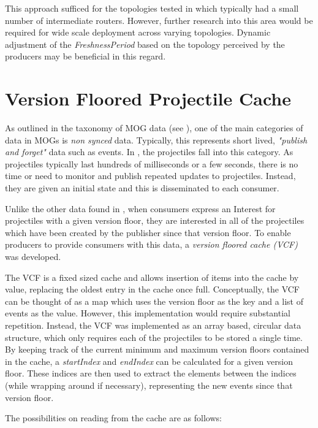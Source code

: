 This approach sufficed for the topologies tested in  which typically had a small number of intermediate routers. However, further research into this area would be required for wide scale deployment across varying topologies. Dynamic adjustment of the \textit{FreshnessPeriod} based on the topology perceived by the producers may be beneficial in this regard.




\section{Version Floored Projectile Cache}
As outlined in the taxonomy of MOG data (see ), one of the main categories of data in MOGs is \textit{non synced} data. Typically, this represents short lived, \textit{"publish and forget"} data such as events. In \game{}, the projectiles fall into this category. As projectiles typically last hundreds of milliseconds or a few seconds, there is no time or need to monitor and publish repeated updates to projectiles. Instead, they are given an initial state and this is disseminated to each consumer. 

Unlike the other data found in \game{}, when consumers express an Interest for projectiles with a given version floor, they are interested in all of the projectiles which have been created by the publisher since that version floor. To enable producers to provide consumers with this data, a \textit{version floored cache (VCF)} was developed.

The VCF is a fixed sized cache and allows insertion of items into the cache by value, replacing the oldest entry in the cache once full. Conceptually, the VCF can be thought of as a map which uses the version floor as the key and a list of events as the value. However, this implementation would require substantial repetition. Instead, the VCF was implemented as an array based, circular data structure, which only requires each of the projectiles to be stored a single time. By keeping track of the current minimum and maximum version floors contained in the cache, a \textit{startIndex} and \textit{endIndex} can be calculated for a given version floor. These indices are then used to extract the elements between the indices (while wrapping around if necessary), representing the new events since that version floor. 

The possibilities on reading from the cache are as follows:

